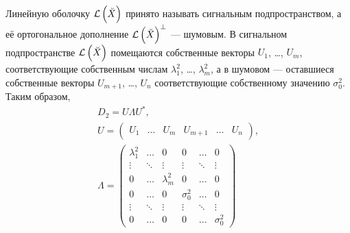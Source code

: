 Линейную оболочку $\mathcal{L} \left ( \breve{X} \right )$ принято называть сигнальным подпространством, а её ортогональное дополнение $\mathcal{L} \left ( \breve{X} \right )^\perp$ --- шумовым. В сигнальном
подпространстве $\mathcal{L} \left ( \breve{X} \right )$ помещаются собственные векторы $U_1$, \dots, $U_m$, соответствующие собственным числам $\lambda_1^2$, \dots, $\lambda_m^2$, а в шумовом ---
оставшиеся собственные векторы $U_{m+1}$, \dots, $U_n$ соответствующие собственному значению $\sigma_0^2$. Таким образом,
\begin{gather*}
    D_2 = U \Lambda U^* , \\
    U
    = \begin{pmatrix}
        U_1 & \dots & U_m & U_{m+1} & \dots & U_n
    \end{pmatrix}, \\
    \Lambda
    = \begin{pmatrix}
        \lambda_1^2 & \dots  & 0           & 0          & \dots  & 0          \\
        \vdots      & \ddots & \vdots      & \vdots     & \ddots & \vdots     \\
        0           & \dots  & \lambda_m^2 & 0          & \dots  & 0          \\
        0           & \dots  & 0           & \sigma_0^2 & \dots  & 0          \\
        \vdots      & \ddots & \vdots      & \vdots     & \ddots & \vdots     \\
        0           & \dots  & 0           & 0          & \dots  & \sigma_0^2
    \end{pmatrix}
\end{gather*}

